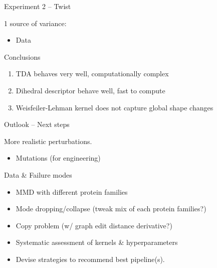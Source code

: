 \documentclass[aspectratio=169, 10pt, dvipsnames, handout]{beamer}
\begin{document}
{\begin{frame}[fragile]{Experiment 2 -- Twist}
\begin{minipage}{0.38\textwidth}
      \pause\small 1 source of variance:
      \begin{itemize}
        \pause\small\item Data
      \end{itemize}

      \begin{alert}{Conclusions}
        \begin{enumerate}
          \pause\item TDA behaves very well, computationally complex
          \pause\item Dihedral descriptor behave well, fast to compute
          \pause\item Weisfeiler-Lehman kernel does not capture global shape changes
        \end{enumerate}
      \end{alert}
    \end{minipage}
  \end{frame}
}

\begin{frame}[fragile]{Outlook -- Next steps}
  \begin{minipage}{0.48\textwidth}
    More realistic perturbations.
    \begin{itemize}
      \pause \item Mutations (for engineering)
    \end{itemize}
    \pause Data \& Failure modes
    \begin{itemize}
      \pause \item MMD with different protein families
      \pause \item Mode dropping/collapse (tweak mix of each protein families?)
      \pause \item Copy problem (w/ graph edit distance derivative?)
    \end{itemize}

  \end{minipage}
  \hfill
  \begin{minipage}{0.48\textwidth}
    \begin{itemize}
      \pause\item Systematic assessment of kernels \& hyperparameters
      \pause\item Devise strategies to recommend best pipeline(s).
     \end{itemize}
  \end{minipage}
\end{frame}
\end{document}
